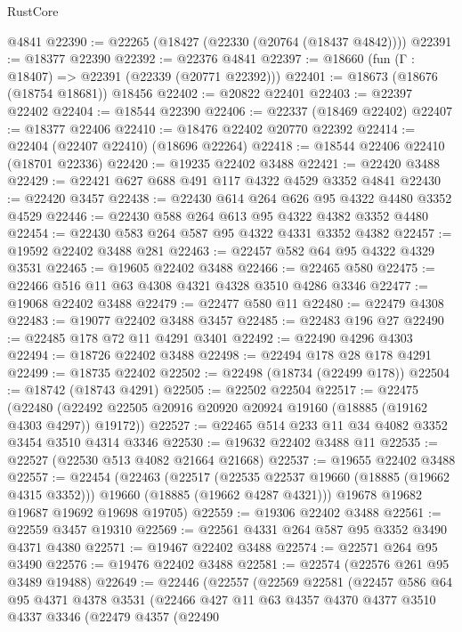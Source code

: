 \begin{lexlean}{RustCore}
\begin{coremodule}
    @4841
@22390 := @22265 (@18427 (@22330 (@20764 (@18437 @4842))))
@22391 := @18377 @22390
@22392 := @22376 @4841
@22397 := @18660 (fun (Γ : @18407) => @22391 (@22339 (@20771 @22392)))
@22401 := @18673 (@18676 (@18754 @18681)) @18456
@22402 := @20822 @22401
@22403 := @22397 @22402
@22404 := @18544 @22390
@22406 := @22337 (@18469 @22402)
@22407 := @18377 @22406
@22410 := @18476 @22402 @20770 @22392
@22414 := @22404 (@22407 @22410) (@18696 @22264)
@22418 := @18544 @22406 @22410 (@18701 @22336)
@22420 := @19235 @22402 @3488
@22421 := @22420 @3488
@22429 := @22421 @627 @688 @491 @117 @4322 @4529 @3352 @4841
@22430 := @22420 @3457
@22438 := @22430 @614 @264 @626 @95 @4322 @4480 @3352 @4529
@22446 := @22430 @588 @264 @613 @95 @4322 @4382 @3352 @4480
@22454 := @22430 @583 @264 @587 @95 @4322 @4331 @3352 @4382
@22457 := @19592 @22402 @3488 @281
@22463 := @22457 @582 @64 @95 @4322 @4329 @3531
@22465 := @19605 @22402 @3488
@22466 := @22465 @580
@22475 := @22466 @516 @11 @63 @4308 @4321 @4328 @3510 @4286 @3346
@22477 := @19068 @22402 @3488
@22479 := @22477 @580 @11
@22480 := @22479 @4308
@22483 := @19077 @22402 @3488 @3457
@22485 := @22483 @196 @27
@22490 := @22485 @178 @72 @11 @4291 @3401
@22492 := @22490 @4296 @4303
@22494 := @18726 @22402 @3488
@22498 := @22494 @178 @28 @178 @4291
@22499 := @18735 @22402
@22502 := @22498 (@18734 (@22499 @178))
@22504 := @18742 (@18743 @4291)
@22505 := @22502 @22504
@22517 := @22475
    (@22480 (@22492 @22505 @20916 @20920 @20924 @19160 (@18885 (@19162 @4303 @4297)) @19172))
@22527 := @22465 @514 @233 @11 @34 @4082 @3352 @3454 @3510 @4314 @3346
@22530 := @19632 @22402 @3488 @11
@22535 := @22527 (@22530 @513 @4082 @21664 @21668)
@22537 := @19655 @22402 @3488
@22557 := @22454
    (@22463
      (@22517
        (@22535 @22537 @19660 (@18885 (@19662 @4315 @3352)))
        @19660
        (@18885 (@19662 @4287 @4321)))
      @19678
      @19682
      @19687
      @19692
      @19698
      @19705)
@22559 := @19306 @22402 @3488
@22561 := @22559 @3457 @19310
@22569 := @22561 @4331 @264 @587 @95 @3352 @3490 @4371 @4380
@22571 := @19467 @22402 @3488
@22574 := @22571 @264 @95 @3490
@22576 := @19476 @22402 @3488
@22581 := @22574 (@22576 @261 @95 @3489 @19488)
@22649 := @22446
    (@22557
      (@22569
        @22581
        (@22457
          @586
          @64
          @95
          @4371
          @4378
          @3531
          (@22466
            @427
            @11
            @63
            @4357
            @4370
            @4377
            @3510
            @4337
            @3346
            (@22479
              @4357
              (@22490

\end{coremodule}
\end{lexlean}
